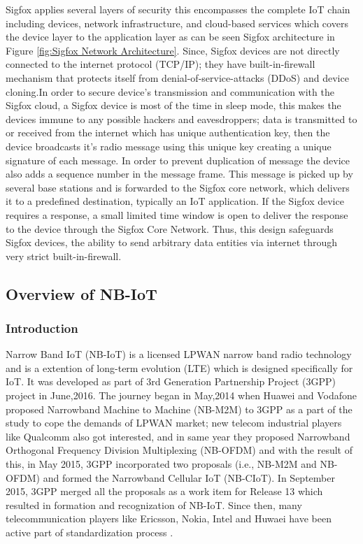 \documentclass[12pt]{article}
\begin{document}
\newpage Sigfox applies several layers of security this encompasses the complete IoT chain including devices, network infrastructure, and cloud-based services which covers the device layer to the application layer as can be seen Sigfox architecture in Figure \ref{fig:Sigfox Network Architecture}. Since, Sigfox devices are not directly connected to the internet protocol (TCP/IP); they have built-in-firewall mechanism that protects itself from denial-of-service-attacks (DDoS) and device cloning.In order to secure device's transmission and communication with the Sigfox
cloud, a Sigfox device is most of the time in sleep mode, this makes the devices immune to any possible hackers and eavesdroppers;  data is transmitted to or received from the internet which has unique authentication key, then the device broadcasts it's radio message using this unique key creating a unique signature of each message. In order to prevent duplication of message the device also adds a sequence number in the message frame. This message is picked up by several base stations and is forwarded to the Sigfox core network, which delivers it to a predefined destination, typically an IoT application. If the Sigfox device requires a response, a small limited time window is open to deliver the response to the device through the Sigfox Core Network. Thus, this design safeguards Sigfox devices, the ability to send arbitrary data entities via internet through very strict built-in-firewall.


\subsection{Overview of NB-IoT}\label{Overview of NB-IoT}

\subsubsection{Introduction}
Narrow Band IoT (NB-IoT) is a licensed LPWAN narrow band radio technology and is a extention of long-term evolution (LTE) which is designed specifically for IoT. It was developed as part of 3rd Generation Partnership Project (3GPP) project in June,2016. The journey began in May,2014 when Huawei and Vodafone proposed Narrowband Machine to Machine (NB-M2M) to 3GPP as a part of the study to cope the demands of LPWAN market; new telecom industrial players like Qualcomm also got interested, and in same year they proposed Narrowband Orthogonal Frequency Division Multiplexing (NB-OFDM) and with the result of this, in May 2015, 3GPP incorporated two proposals (i.e., NB-M2M and NB-OFDM) and formed the Narrowband Cellular IoT (NB-CIoT). In September 2015, 3GPP merged all the proposals as a work item for Release 13 which resulted in formation and recognization of NB-IoT. Since then, many telecommunication players like Ericsson, Nokia, Intel and Huwaei have been active part of standardization process \cite{5GUK,malik2018radio,mwakwata2019narrowband}.
\end{document}
